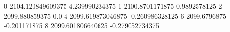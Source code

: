 0 2104.120849609375 4.239990234375
1 2100.8701171875 0.9892578125
2 2099.880859375 0.0
4 2099.619873046875 -0.260986328125
6 2099.6796875 -0.201171875
8 2099.601806640625 -0.279052734375
